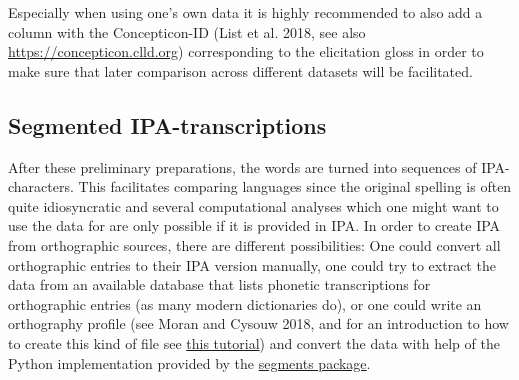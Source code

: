 \documentclass[
  a4paper,
  14pt,
  oneside,
  tablecaptionabove
]{scrbook}
\begin{document}
\begin{table}[h]
\captionsetup{justification=centering}
\caption*{\small \textbf{Table 1:} Entries from the Old High German wordlist of the World
Loanword Database (Haspelmath 2009) prepared for further annotation.}
\end{table}


Especially when using one's own data it is highly recommended to also
add a column with the Concepticon-ID (List et al. 2018, see also
\url{https://concepticon.clld.org}) corresponding to the elicitation
gloss in order to make sure that later comparison across different
datasets will be facilitated.

\subsection*{Segmented IPA-transcriptions}

After these preliminary preparations, the words are turned into
sequences of IPA-characters. This facilitates comparing languages since
the original spelling is often quite idiosyncratic and several
computational analyses which one might want to use the data for are only
possible if it is provided in IPA. In order to create IPA from
orthographic sources, there are different possibilities: One could
convert all orthographic entries to their IPA version manually, one
could try to extract the data from an available database that lists
phonetic transcriptions for orthographic entries (as many modern
dictionaries do), or one could write an orthography profile (see Moran
and Cysouw 2018, and for an introduction to how to create this kind of
file see
\href{http://htmlpreview.github.io/?https://raw.githubusercontent.com/digling/calc-seminar/master/handouts/Session_6.html}{this
tutorial}) and convert the data with help of the Python implementation
provided by the \href{https://github.com/cldf/segments}{segments
package}. 
\end{document}
